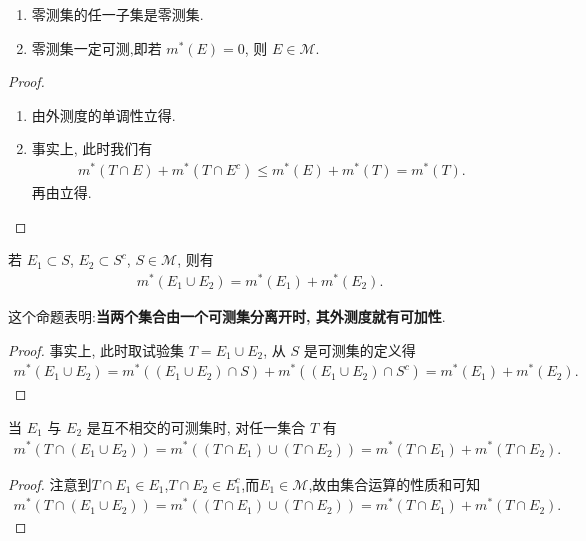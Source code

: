 \documentclass[../../main.tex]{subfiles}%
\begin{document}
\begin{proposition}\label{proposition:零测集的基本性质}
\begin{enumerate}
\item 零测集的任一子集是零测集.

\item 零测集一定可测,即若 \(m^*(E)=0\), 则 \(E \in \mathscr{M}\). 
\end{enumerate}
\end{proposition}
\begin{proof}
\begin{enumerate}
\item 由外测度的单调性立得.

\item 事实上, 此时我们有
\begin{align*}
m^*(T \cap E)+m^*(T \cap E^c) \leqslant  m^*(E)+m^*(T)=m^*(T).
\end{align*}
再由立得.
\end{enumerate}

\end{proof}

\begin{proposition}\label{proposition:外测度的可加性的条件}
若 \(E_1 \subset S\), \(E_2 \subset S^c\), \(S \in \mathscr{M}\), 则有
\begin{align*}
m^*(E_1 \cup E_2) = m^*(E_1) + m^*(E_2).
\end{align*}
\end{proposition}
\begin{remark}
这个命题表明:\textbf{当两个集合由一个可测集分离开时, 其外测度就有可加性}.
\end{remark}
\begin{proof}

事实上, 此时取试验集 \(T = E_1 \cup E_2\), 从 \(S\) 是可测集的定义得
\begin{align*}
m^*(E_1 \cup E_2) = m^*((E_1 \cup E_2) \cap S) + m^*((E_1 \cup E_2) \cap S^c) = m^*(E_1) + m^*(E_2).
\end{align*}

\end{proof}

\begin{corollary}\label{corollary:2个无交可测集与任意集合的并的外测度的性质}
当 \(E_1\) 与 \(E_2\) 是互不相交的可测集时, 对任一集合 \(T\) 有
\begin{align*}
m^*(T \cap (E_1 \cup E_2)) =m^*((T\cap E_1)\cup (T\cap E_2))= m^*(T \cap E_1) + m^*(T \cap E_2).
\end{align*} 
\end{corollary}
\begin{proof}

注意到$T\cap E_1\in E_1$,$T\cap E_2\in E_1^c$,而$E_1\in \mathscr{M}$,故由集合运算的性质和可知
\begin{align*}
m^*(T \cap (E_1 \cup E_2))=m^*((T\cap E_1)\cup (T\cap E_2)) = m^*(T \cap E_1) + m^*(T \cap E_2).
\end{align*} 

\end{proof}
\end{document}
